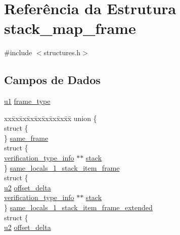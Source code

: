 \hypertarget{structstack__map__frame}{}\section{Referência da Estrutura stack\+\_\+map\+\_\+frame}
\label{structstack__map__frame}


{\ttfamily \#include $<$structures.\+h$>$}

\subsection*{Campos de Dados}
\begin{DoxyCompactItemize}
\item 
\hyperlink{lista__operandos_8h_ad9f4cdb6757615aae2fad89dab3c5470}{u1} \hyperlink{structstack__map__frame_ae7d53e0f8daea6d5738a88ffb94e575c}{frame\+\_\+type}
\item 
\begin{tabbing}
xx\=xx\=xx\=xx\=xx\=xx\=xx\=xx\=xx\=\kill
union \{\\
\>struct \{\\
\>\} \hyperlink{structstack__map__frame_a761073b8521c7ac269b5357dfcf963b6}{same\_frame}\\
\>struct \{\\
\>\>\hyperlink{structverification__type__info}{verification\_type\_info} $\ast$$\ast$ \hyperlink{structstack__map__frame_acf0d1f6336e72271bc0d91186a9360d5}{stack}\\
\>\} \hyperlink{structstack__map__frame_a5503eba82f65aaa1b91d7bebf48f778a}{same\_locals\_1\_stack\_item\_frame}\\
\>struct \{\\
\>\>\hyperlink{lista__operandos_8h_a732cde1300aafb73b0ea6c2558a7a54f}{u2} \hyperlink{structstack__map__frame_a6eb1565feda91c1edced70dc473c834d}{offset\_delta}\\
\>\>\hyperlink{structverification__type__info}{verification\_type\_info} $\ast$$\ast$ \hyperlink{structstack__map__frame_acf0d1f6336e72271bc0d91186a9360d5}{stack}\\
\>\} \hyperlink{structstack__map__frame_a13c670726708696c2f2b9d12309d7038}{same\_locals\_1\_stack\_item\_frame\_extended}\\
\>struct \{\\
\>\>\hyperlink{lista__operandos_8h_a732cde1300aafb73b0ea6c2558a7a54f}{u2} \hyperlink{structstack__map__frame_a6eb1565feda91c1edced70dc473c834d}{offset\_delta}\\

\end{tabbing}
\end{DoxyCompactItemize}
